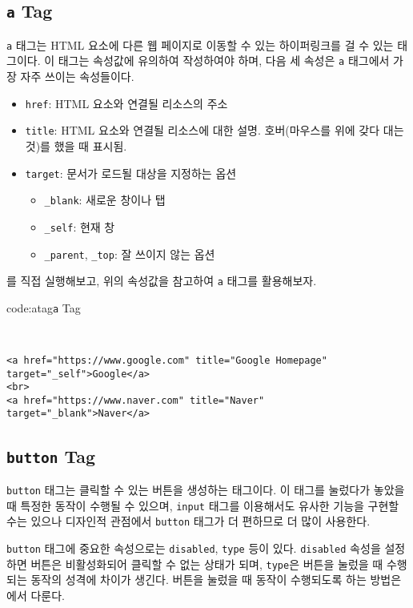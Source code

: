 \subsection*{\texttt{a} Tag}
\verb|a| 태그는 HTML 요소에 다른 웹 페이지로 이동할 수 있는 하이퍼링크를 걸 수 있는 태그이다. 이 태그는 속성값에 유의하여 작성하여야 하며, 다음 세 속성은 \verb|a| 태그에서 가장 자주 쓰이는 속성들이다. 

\begin{itemize}
    \item \verb|href|: HTML 요소와 연결될 리소스의 주소
    \item \verb|title|: HTML 요소와 연결될 리소스에 대한 설명. 호버(마우스를 위에 갖다 대는 것)를 했을 때 표시됨.
    \item \verb|target|: 문서가 로드될 대상을 지정하는 옵션
        \begin{itemize}
            \item \verb|_blank|: 새로운 창이나 탭
            \item \verb|_self|: 현재 창
            \item \verb|_parent|, \verb|_top|: 잘 쓰이지 않는 옵션
        \end{itemize}
\end{itemize}

를 직접 실행해보고, 위의 속성값을 참고하여 \verb|a| 태그를 활용해보자.

\begin{codeenv}{code:atag}{\texttt{a} Tag}\begin{verbatim}


<a href="https://www.google.com" title="Google Homepage" target="_self">Google</a>
<br>
<a href="https://www.naver.com" title="Naver" target="_blank">Naver</a>
\end{verbatim}
\end{codeenv}

\subsection*{\texttt{button} Tag}
\verb|button| 태그는 클릭할 수 있는 버튼을 생성하는 태그이다. 이 태그를 눌렀다가 놓았을 때 특정한 동작이 수행될 수 있으며, \verb|input| 태그를 이용해서도 유사한 기능을 구현할 수는 있으나 디자인적 관점에서 \verb|button| 태그가 더 편하므로 더 많이 사용한다. 

\verb|button| 태그에 중요한 속성으로는 \verb|disabled|, \verb|type| 등이 있다. \verb|disabled| 속성을 설정하면 버튼은 비활성화되어 클릭할 수 없는 상태가 되며, \verb|type|은 버튼을 눌렀을 때 수행되는 동작의 성격에 차이가 생긴다. 버튼을 눌렀을 때 동작이 수행되도록 하는 방법은 에서 다룬다.

